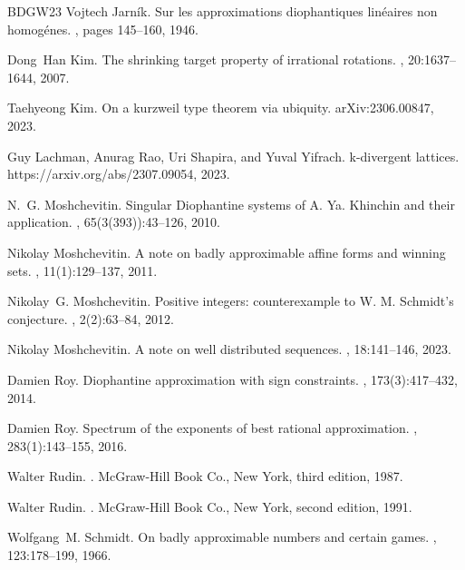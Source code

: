 \documentclass[reqno,11pt, twoside]{amsart}
\theoremstyle{plain}
\theoremstyle{definition}
\theoremstyle{definition}
\theoremstyle{remark}
\numberwithin{equation}{section}
\begin{document}
\begin{thebibliography}{BDGW23}
Vojtech Jarn{\'i}k.
\newblock Sur les approximations diophantiques lin{\'e}aires non homog{\'e}nes.
,
  pages 145--160, 1946.

Dong~Han Kim.
\newblock The shrinking target property of irrational rotations.
, 20:1637--1644, 2007.

Taehyeong Kim.
\newblock On a kurzweil type theorem via ubiquity.
\newblock arXiv:2306.00847, 2023.

Guy Lachman, Anurag Rao, Uri Shapira, and Yuval Yifrach.
\newblock k-divergent lattices.
\newblock https://arxiv.org/abs/2307.09054, 2023.

N.~G. Moshchevitin.
\newblock Singular {D}iophantine systems of {A}. {Y}a. {K}hinchin and their
  application.
, 65(3(393)):43--126, 2010.

Nikolay Moshchevitin.
\newblock A note on badly approximable affine forms and winning sets.
, 11(1):129--137, 2011.

Nikolay~G. Moshchevitin.
\newblock Positive integers: counterexample to {W}. {M}. {S}chmidt's
  conjecture.
, 2(2):63--84, 2012.

Nikolay Moshchevitin.
\newblock A note on well distributed sequences.
, 18:141--146, 2023.

Damien Roy.
\newblock Diophantine approximation with sign constraints.
, 173(3):417--432, 2014.

Damien Roy.
\newblock Spectrum of the exponents of best rational approximation.
, 283(1):143--155, 2016.

Walter Rudin.
.
\newblock McGraw-Hill Book Co., New York, third edition, 1987.

Walter Rudin.
.
\newblock McGraw-Hill Book Co., New York, second edition, 1991.

Wolfgang~M. Schmidt.
\newblock On badly approximable numbers and certain games.
, 123:178--199, 1966.


\end{thebibliography}
\end{document}
